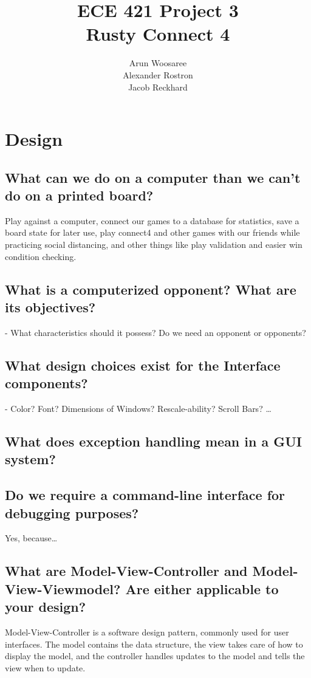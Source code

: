 \documentclass[letterpaper]{article}
\title{ECE 421 Project 3\\
Rusty Connect 4}
\author{Arun Woosaree\\
Alexander Rostron\\
Jacob Reckhard
}
\begin{document}
\maketitle %


\section{Design}
\subsection{What can we do on a computer than we can’t do on a printed board?}
Play against a computer, connect our games to a database for statistics, save a board state for later use, play connect4 and other games with our friends while practicing social distancing, and other things like play validation and easier win condition checking.

\subsection{What is a computerized opponent? What are its objectives?}
- What characteristics should it possess? Do we need an opponent or opponents?


\subsection{What design choices exist for the Interface components?}
- Color? Font? Dimensions of Windows? Rescale-ability? Scroll Bars? \dots

\subsection{What does exception handling mean in a GUI system?}

\subsection{Do we require a command-line interface for debugging purposes?}
Yes, because\dots

\subsection{What are Model-View-Controller and Model-View-Viewmodel? Are either applicable to your
design?}

Model-View-Controller is a software design pattern, commonly used for user interfaces.
The model contains the data structure, the view takes care of how to display the model,
and the controller handles updates to the model and tells the view when to update.
\end{document}
